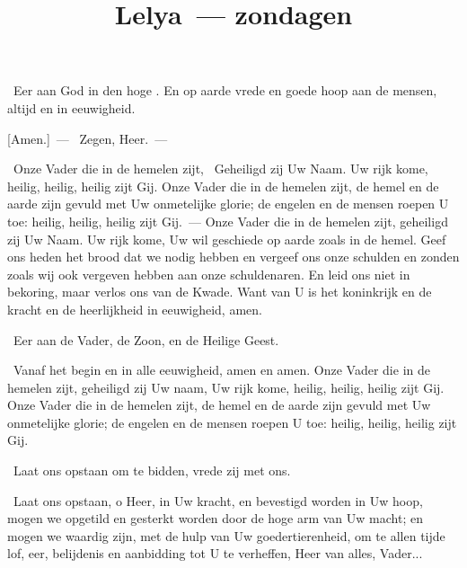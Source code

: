 \documentclass[12pt,twoside,a5paper]{article}
\begin{document}
\title{Lelya~--- zondagen}
\author{}
\date{}
\maketitle

\footnotelayout{\ }


\begin{halfparskip}
  \cc~Eer aan God in den hoge . En op aarde vrede en goede hoop aan de mensen, altijd en in eeuwigheid.

  [Amen.]~--- \rr~Zegen, Heer.~--- \liturgicalhint{[Vredekus.]}

  \cc~Onze Vader die in de hemelen zijt,
  \rr~Geheiligd zij Uw Naam. Uw rijk kome, heilig, heilig, heilig zijt Gij. Onze Vader die in de hemelen zijt, de hemel en de aarde zijn gevuld met Uw onmetelijke glorie; de engelen en de mensen roepen U toe: heilig, heilig, heilig zijt Gij.~--- Onze Vader die in de hemelen zijt, geheiligd zij Uw Naam. Uw rijk kome, Uw wil geschiede op aarde zoals in de hemel. Geef ons heden het brood dat we nodig hebben en vergeef ons onze schulden en zonden zoals wij ook vergeven hebben aan onze schuldenaren. En leid ons niet in bekoring, maar verlos ons van de Kwade. Want van U is het koninkrijk en de kracht en de heerlijkheid in eeuwigheid, amen.

  \cc~Eer aan de Vader, de Zoon, en de Heilige Geest.

  \rr~Vanaf het begin en in alle eeuwigheid, amen en amen. Onze Vader die in de hemelen zijt, geheiligd zij Uw naam, Uw rijk kome, heilig, heilig, heilig zijt Gij. Onze Vader die in de hemelen zijt, de hemel en de aarde zijn gevuld met Uw onmetelijke glorie; de engelen en de mensen roepen U toe: heilig, heilig, heilig zijt Gij.

  \dd~Laat ons opstaan om te bidden, vrede zij met ons.

  \cc~Laat ons opstaan, o Heer, in Uw kracht, en bevestigd worden in Uw hoop, mogen we opgetild en gesterkt worden door de hoge arm van Uw macht; en mogen we waardig zijn, met de hulp van Uw goedertierenheid, om te allen tijde lof, eer, belijdenis en aanbidding tot U te verheffen, Heer van alles, Vader...
\end{halfparskip}
\end{document}
